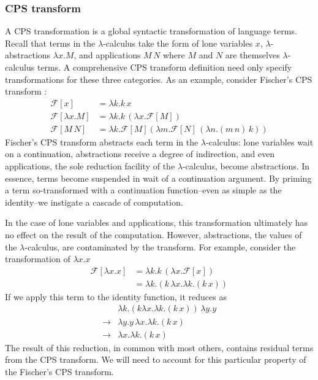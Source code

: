 \documentclass[ms,electronic,twosidetoc,letterpaper,chaptercenter,parttop]{byumsphd}
\begin{document}
\subsubsection{CPS transform}

A CPS transformation is a global syntactic transformation of language terms. Recall that
terms in the $\lambda$-calculus take the form of lone variables $x$,
$\lambda$-abstractions $\lambda x.M$, and applications $M\,N$ where $M$ and $N$ are
themselves $\lambda$-calculus terms. A comprehensive CPS transform definition need only
specify transformations for these three categories. As an example, consider Fischer's CPS
transform \cite{fischer1972lambda}:
\begin{align*}
\mathcal{F}[x]           &= \lambda k.k\,x\\
\mathcal{F}[\lambda x.M] &= \lambda k.k\,(\lambda x.\mathcal{F}[M])\\
\mathcal{F}[M\,N]        &= \lambda k.\mathcal{F}[M](\lambda m.\mathcal{F}[N]\,(\lambda n.(m\,n)\,k))
\end{align*}
Fischer's CPS transform abstracts each term in the $\lambda$-calculus: lone variables
wait on a continuation, abstractions receive a degree of indirection, and even
applications, the sole reduction facility of the $\lambda$-calculus, become abstractions.
In essence, terms become suspended in wait of a continuation argument. By priming a term
so-transformed with a continuation function--even as simple as the identity--we instigate
a cascade of computation.

In the case of lone variables and applications, this transformation ultimately has no
effect on the result of the computation. However, abstractions, the values of the
$\lambda$-calculus, are contaminated by the transform. For example, consider the
transformation of $\lambda x.x$
\begin{align*}
\mathcal{F}[\lambda x.x] &= \lambda k.k\,(\lambda x.\mathcal{F}[x])\\
                         &= \lambda k.(k\,\lambda x.\lambda k.(k\,x))
\end{align*}
If we apply this term to the identity function, it reduces as
\begin{align*}
            &\lambda k.(k \lambda x.\lambda k.(k\,x))\,\lambda y.y\\
\rightarrow &\lambda y.y\,\lambda x.\lambda k.(k\,x)\\
\rightarrow &\lambda x.\lambda k.(k\,x)
\end{align*}
The result of this reduction, in common with most others, contains residual terms from the
CPS transform. We will need to account for this particular property of the Fischer's CPS
transform.
\end{document}

